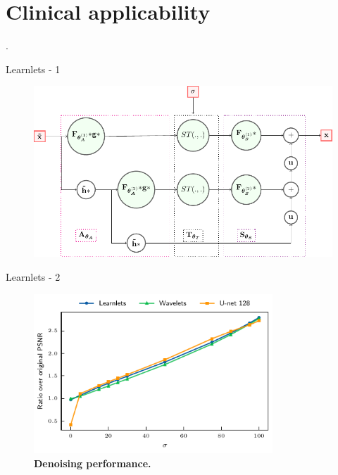 \section{Clinical applicability}

\begin{frame}[plain,c]

    \begin{center}
        \color{DarkBlue}
    \Huge \thesection. \insertsection
    \end{center}

\end{frame}


\begin{frame}{Learnlets - 1}
    \begin{figure}
        \centering
        \includegraphics[height=0.8\textheight]{Figures/clinic_applic/learnlets_tikz_reduced.pdf}
    \end{figure}
\end{frame}

\begin{frame}{Learnlets - 2}
    \begin{figure}[ht]
        \includegraphics[width=0.8\textwidth]{Figures/clinic_applic/model_comparison.pdf}
        \caption{\textbf{Denoising performance.}}
        \end{figure}
\end{frame}

